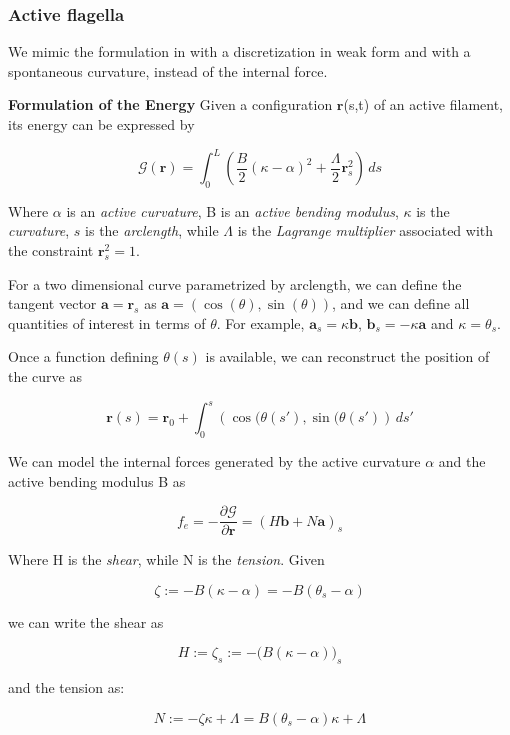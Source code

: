 
\subsubsection{Active flagella}
We mimic the formulation in \cite{julicher} with a discretization in weak form and with a spontaneous curvature, instead of the internal force.



\textbf{Formulation of the Energy}
Given a configuration $\mathbf{r}$(s,t) of an active filament, its energy can be expressed by

\[\mathcal{G}(\mathbf{r}) = \int_0^L \left( \frac{B}{2}(\kappa-\alpha)^2 +
  \frac{\Lambda}{2} \mathbf{r}_s^2 \right) \,d s\]

Where $\alpha$ is an \emph{active curvature}, B is an \emph{active
  bending modulus}, $\kappa$ is the \emph{curvature}, $s$ is the
\emph{arclength}, while $\Lambda$ is the \emph{Lagrange multiplier}
associated with the constraint $\mathbf{r}_s^2 = 1$.

For a two dimensional curve parametrized by arclength, we can define
the tangent vector $\mathbf{a} = \mathbf{r}_s$ as $\mathbf{a} = (\cos(\theta), \sin(\theta))$, and
we can define all quantities of interest in terms of $\theta$. For
example, $\mathbf{a}_s = \kappa \mathbf{b}$, $\mathbf{b}_s = -\kappa \mathbf{a}$ and $\kappa = \theta_s$.

Once a function defining \(\theta(s)\) is available, we can reconstruct
the position of the curve as

\[\mathbf{r}(s) = \mathbf{r}_0 + \int_0^s \left(\cos(\theta(s'), \sin(\theta(s') \right)
\,d s'\]

We can model the internal forces generated by the active curvature
$\alpha$ and the active bending modulus B as

\[f_e = -\frac{\partial \mathcal{G}}{\partial \mathbf{r}} = (H \mathbf{b} + N \mathbf{a})_s\]

Where H is the \emph{shear}, while N is the
\emph{tension}. Given 

\[\zeta := -B(\kappa - \alpha) = -B(\theta_s - \alpha)\]

we can write the shear as

\[H := \zeta_s := -\big( B(\kappa - \alpha) \big)_s\]

and the tension as:

\[N := -\zeta\kappa + \Lambda = B(\theta_s-\alpha)\kappa +\Lambda\]

\\\\


